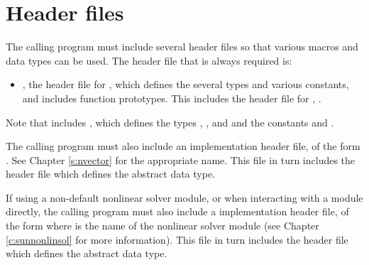 \section{Header files}\label{ss:header_sim}
The calling program must include several header files so that various macros
and data types can be used. The header file that is always required is:
\begin{itemize}
\item  {},
  the header file for {\ida}, which defines the several
  types and various constants, and includes function prototypes.  This
  includes the header file for {\idals}, .
\end{itemize}
Note that  includes ,
which defines the types , , and 
and the constants  and .

The calling program must also include an {\nvector} implementation header file,
of the form \\ \noindent
{}.  See Chapter \ref{s:nvector} for the appropriate
name.  This file in turn includes the header file 
which defines the abstract  data type.

If using a non-default nonlinear solver module, or when interacting
with a {\sunnonlinsol} module directly, the calling program must also
include a {\sunnonlinsol} implementation header file, of the form
 where \id{***} is the name of the
nonlinear solver module (see Chapter \ref{c:sunnonlinsol} for more
information). This file in turn includes the header file
 which defines the abstract
 data type.

